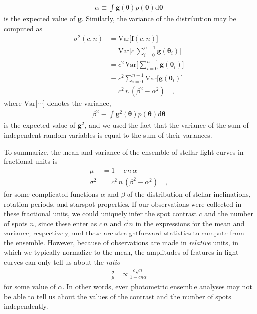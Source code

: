 \documentclass[modern]{aastex62}
\begin{document}
%
\begin{align}
    \alpha \equiv \int \mathbf{g} (\pmb{\theta}) p(\pmb{\theta}) \mathrm{d} \pmb{\theta}
\end{align}
%
is the expected value of $\mathbf{g}$.
%
Similarly, the variance of the distribution may be computed as
%
\begin{align}
    \sigma^2(c, n) & = \mathrm{Var} \Big[ \mathbf{f}(c, n) \Big] \nonumber                         \nonumber \\
                   & = \mathrm{Var} \Big[ c \, \sum_{i=0}^{n-1} \mathbf{g}(\pmb{\theta}_i) \Big]   \nonumber \\
                   & = c^2 \, \mathrm{Var} \Big[ \sum_{i=0}^{n-1} \mathbf{g}(\pmb{\theta}_i) \Big] \nonumber \\
                   & = c^2 \sum_{i=0}^{n-1} \mathrm{Var} \Big[  \mathbf{g}(\pmb{\theta}_i) \Big]   \nonumber \\
                   & = c^2 \, n \, (\beta^2 - \alpha^2)
    \quad,
\end{align}
%
where $\mathrm{Var}\big[\cdots\big]$ denotes the variance,
%
\begin{align}
    \beta^2 \equiv \int \mathbf{g}^2 (\pmb{\theta}) p(\pmb{\theta}) \mathrm{d} \pmb{\theta}
\end{align}
%
is the expected value of $\mathbf{g}^2$, and we used the fact that the variance
of the sum of independent random variables is equal to the sum of their variances.

%

To summarize, the mean and variance of the ensemble of stellar light curves
in fractional units is
%
\begin{align}
    \mu      & = 1 - c \, n \, \alpha
    \nonumber                                     \\
    \sigma^2 & = c^2 \, n \, (\beta^2 - \alpha^2)
    \quad,
\end{align}
%
for some complicated functions $\alpha$ and $\beta$ of the distribution of
stellar inclinations,
rotation periods, and starspot properties.
%
If our observations were collected in these fractional units,
we could uniquely infer the spot contrast $c$ and the number of spots $n$,
since these enter as $c \, n$ and $c^2 n$ in the expressions for the mean
and variance, respectively, and these are straightforward statistics to
compute from the ensemble.
%
However, because of observations are made in \emph{relative} units, in which
we typically normalize to the mean, the amplitudes of features in light curves
can only tell us about the \emph{ratio}
%
\begin{align}
    \label{eq:ratio}
    \frac{\sigma}{\mu}
     & \propto \frac{c \sqrt{n}}{1 - c n \alpha}
\end{align}
%
for some value of $\alpha$.
In other words, even photometric ensemble analyses may not be able to tell
us about the values of the contrast and the number of spots independently.
\end{document}
